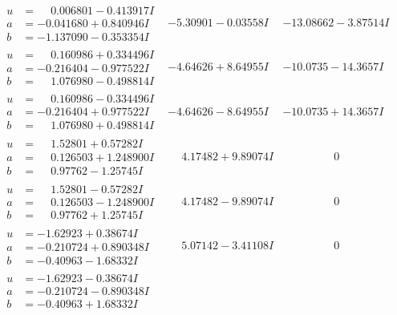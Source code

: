 \documentclass[1p]{elsarticle_modified}
\theoremstyle{definition}
\begin{document}
$$\begin{array}{c|c|c}
\begin{aligned}
u &= \phantom{-}0.006801 - 0.413917 I \\
a &= -0.041680 + 0.840946 I \\
b &= -1.137090 - 0.353354 I\end{aligned}
 & -5.30901 - 0.03558 I & -13.08662 - 3.87514 I \\ \hline\begin{aligned}
u &= \phantom{-}0.160986 + 0.334496 I \\
a &= -0.216404 - 0.977522 I \\
b &= \phantom{-}1.076980 - 0.498814 I\end{aligned}
 & -4.64626 + 8.64955 I & -10.0735 - 14.3657 I \\ \hline\begin{aligned}
u &= \phantom{-}0.160986 - 0.334496 I \\
a &= -0.216404 + 0.977522 I \\
b &= \phantom{-}1.076980 + 0.498814 I\end{aligned}
 & -4.64626 - 8.64955 I & -10.0735 + 14.3657 I \\ \hline\begin{aligned}
u &= \phantom{-}1.52801 + 0.57282 I \\
a &= \phantom{-}0.126503 + 1.248900 I \\
b &= \phantom{-}0.97762 - 1.25745 I\end{aligned}
 & \phantom{-}4.17482 + 9.89074 I & \phantom{-0.000000 } 0 \\ \hline\begin{aligned}
u &= \phantom{-}1.52801 - 0.57282 I \\
a &= \phantom{-}0.126503 - 1.248900 I \\
b &= \phantom{-}0.97762 + 1.25745 I\end{aligned}
 & \phantom{-}4.17482 - 9.89074 I & \phantom{-0.000000 } 0 \\ \hline\begin{aligned}
u &= -1.62923 + 0.38674 I \\
a &= -0.210724 + 0.890348 I \\
b &= -0.40963 - 1.68332 I\end{aligned}
 & \phantom{-}5.07142 - 3.41108 I & \phantom{-0.000000 } 0 \\ \hline\begin{aligned}
u &= -1.62923 - 0.38674 I \\
a &= -0.210724 - 0.890348 I \\
b &= -0.40963 + 1.68332 I\end{aligned}

\end{array}$$
\end{document}
